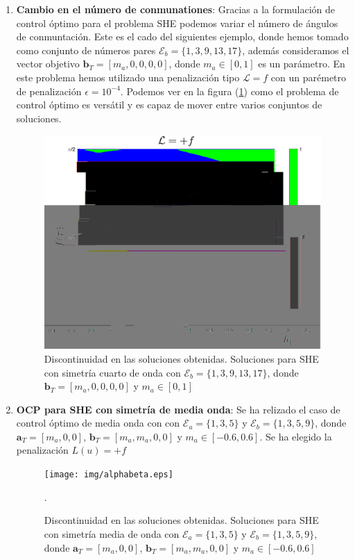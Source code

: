 \begin{enumerate}
    
    
      


    \item \textbf{Cambio en el número de conmunationes}: Gracias a la formulación de control óptimo para el problema SHE podemos variar el número de ángulos de conmuntación. 
    Este es el cado del siguientes ejemplo, donde hemos tomado como conjunto de números pares $\mathcal{E}_b = \{1,3,9,13,17\}$,   además consideramos el vector objetivo $\bm{b}_T = [m_a,0,0,0,0]$, donde  $m_a \in [0,1]$ es un parámetro. 
    En este problema hemos utilizado una penalización tipo $\mathcal{L} = f$ con un parémetro de penalización $\epsilon=10^{-4}$.
    Podemos ver en la figura (\ref{disco}) como el problema de control óptimo es versátil y es capaz de mover entre varios conjuntos de soluciones.



    \begin{figure}[!ht]
        \centering
        \includegraphics[scale=0.45]{img/EX00_surf_2LVL.eps}
        \caption{Discontinuidad en las soluciones obtenidas. Soluciones para SHE con simetría cuarto de onda con $\mathcal{E}_b = \{1,3,9,13,17\}$, donde $\bm{b}_T = [m_a,0,0,0,0]$ y  $m_a \in [0,1]$}
        \label{disco}
    \end{figure}


    
    \item \textbf{OCP para SHE con simetría de media onda}: Se ha relizado el caso de control óptimo de media onda con con $\mathcal{E}_a = \{1,3,5\}$ y  $\mathcal{E}_b = \{1,3,5,9\}$, donde $\bm{a}_T = [m_a,0,0]$, $\bm{b}_T = [m_a,m_a,0,0]$ y  $m_a \in [-0.6,0.6]$. Se ha elegido la penalización $L(u) = +f$
    \begin{figure}
        \centering
        \texttt{[image: img/alphabeta.eps]}
        \caption{Discontinuidad en las soluciones obtenidas. Soluciones para SHE con simetría media de onda con $\mathcal{E}_a = \{1,3,5\}$ y  $\mathcal{E}_b = \{1,3,5,9\}$, donde $\bm{a}_T = [m_a,0,0]$, $\bm{b}_T = [m_a,m_a,0,0]$ y  $m_a \in [-0.6,0.6]$}. 


\end{figure}
\end{enumerate}
